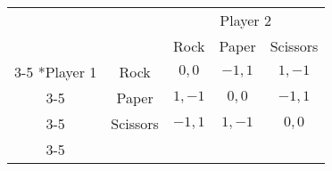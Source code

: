 
\setlength{\extrarowheight}{3pt}

\begin{tabular}{cc|c|c|c|}
                            & \multicolumn{1}{c}{} & \multicolumn{3}{c}{Player 2}                                                            \\
                            & \multicolumn{1}{c}{} & \multicolumn{1}{c}{Rock}     & \multicolumn{1}{c}{Paper} & \multicolumn{1}{c}{Scissors} \\ \cline{3-5}
    \multirow{3}*{Player 1} & Rock                 & $0, 0$                       & $-1, 1$                   & $1, -1$                      \\ \cline{3-5}
                            & Paper                & $1, -1$                      & $0, 0$                    & $-1, 1$                      \\ \cline{3-5}
                            & Scissors             & $-1, 1$                      & $1, -1$                   & $0, 0$                       \\ \cline{3-5}
\end{tabular}

\setlength{\extrarowheight}{0pt}